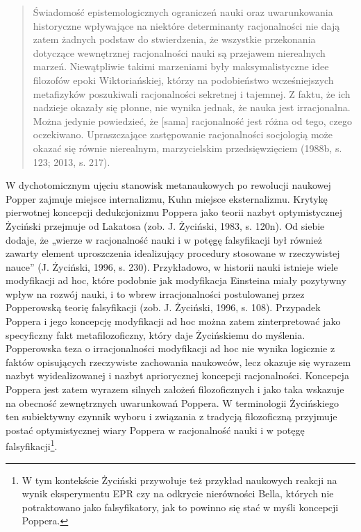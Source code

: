 \documentclass{article}
\begin{document}
\begin{quotation}
Świadomość epistemologicznych ograniczeń nauki oraz uwarunkowania historyczne wpływające na niektóre determinanty
racjonalności nie dają zatem żadnych podstaw do stwierdzenia, że wszystkie przekonania dotyczące wewnętrznej
racjonalności nauki są przejawem nierealnych marzeń. Niewątpliwie takimi marzeniami były maksymalistyczne idee
filozofów epoki Wiktoriańskiej, którzy na podobieństwo wcześniejszych metafizyków poszukiwali racjonalności sekretnej i
tajemnej. Z faktu, że ich nadzieje okazały się płonne, nie wynika jednak, że nauka jest irracjonalna. Można jedynie
powiedzieć, że [sama] racjonalność jest różna od tego, czego oczekiwano. Upraszczające zastępowanie racjonalności
socjologią może okazać się równie nierealnym, marzycielskim przedsięwzięciem  (1988b, s. 123; 2013, s. 217).

\end{quotation}
W dychotomicznym ujęciu stanowisk metanaukowych po rewolucji naukowej Popper zajmuje miejsce internalizmu, Kuhn miejsce
eksternalizmu. Krytykę pierwotnej koncepcji dedukcjonizmu Poppera jako teorii nazbyt optymistycznej Życiński przejmuje
od Lakatosa \label{ref:RNDCRLw5MmQwf}(zob. J. Życiński, 1983, s. 120n). Od siebie dodaje, że  „wierze w racjonalność
nauki i w potęgę falsyfikacji był również zawarty element uproszczenia idealizujący procedury stosowane w rzeczywistej
nauce” \label{ref:RNDR9nCa1gaG1}(J. Życiński, 1996, s. 230).  Przykładowo, w historii nauki istnieje wiele modyfikacji
ad hoc, które podobnie jak modyfikacja Einsteina miały pozytywny wpływ na rozwój nauki, i to wbrew irracjonalności
postulowanej przez Popperowską teorię falsyfikacji \label{ref:RNDq9oApJerP4}(zob. J. Życiński, 1996, s. 108). Przypadek
Poppera i jego koncepcję modyfikacji ad hoc można zatem zinterpretować jako specyficzny fakt metafilozoficzny, który
daje Życińskiemu do myślenia. Popperowska teza o irracjonalności modyfikacji ad hoc nie wynika logicznie z faktów
opisujących rzeczywiste zachowania naukowców, lecz okazuje się wyrazem nazbyt wyidealizowanej i nazbyt apriorycznej
koncepcji racjonalności. Koncepcja Poppera jest zatem wyrazem silnych założeń filozoficznych i jako taka wskazuje na
obecność zewnętrznych uwarunkowań Poppera. W terminologii Życińskiego ten subiektywny czynnik wyboru i związania z
tradycją filozoficzną przyjmuje postać optymistycznej wiary Poppera w racjonalność nauki i w potęgę
falsyfikacji\footnote{W tym kontekście Życiński przywołuje też przykład naukowych reakcji na wynik eksperymentu EPR czy
na  odkrycie nierówności Bella, których nie potraktowano jako falsyfikatory, jak to powinno się stać w myśli koncepcji
Poppera.}.
\end{document}
